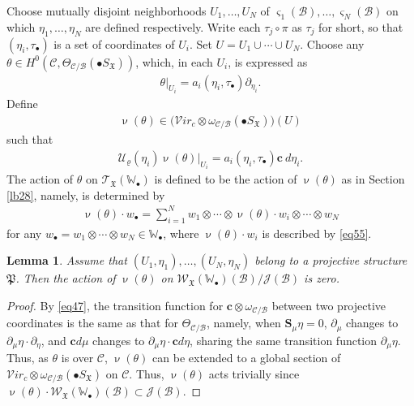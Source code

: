 \documentclass[11pt,b5paper,notitlepage]{article}
\theoremstyle{definition}
\theoremstyle{plain}
\newtheorem{lm}[df]{Lemma}
\newcommand{\fk}{\mathfrak}
\newcommand{\mc}{\mathcal}
\newcommand{\scr}{\mathscr}
\newcommand{\sgm}{\varsigma}
\newcommand{\SX}{S_{\fk X}}
\newcommand{\blt}{\bullet}
\newcommand{\Wbb}{\mathbb W}
\newcommand{\cbf}{\mathbf c}
\newcommand{\svir}{\mathcal V\!\mathit{ir}}
\newcommand{\Sbf}{\mathbf{S}}
\numberwithin{equation}{section}
\begin{document}
Choose mutually disjoint neighborhoods $U_1,\dots,U_N$ of $\sgm_1(\mc B),\dots,\sgm_N(\mc B)$ on which $\eta_1,\dots,\eta_N$ are defined respectively. Write each $\tau_j\circ\pi$ as $\tau_j$ for short, so that $(\eta_i,\tau_\blt)$ is a set of coordinates of $U_i$. Set $U=U_1\cup\cdots\cup U_N$. Choose any $\theta\in H^0(\mc C,\Theta_{\mc C/\mc B}(\blt\SX))$, which, in each $U_i$, is expressed as
\begin{align}
\theta|_{U_i}=a_i(\eta_i,\tau_\blt)\partial_{\eta_i}.\label{eq52}
\end{align}
Define 
\begin{align*}
\upnu(\theta)\in \big(\svir_c\otimes \omega_{\mc C/\mc B}(\blt S_{\fk X})\big)(U)
\end{align*}
such that
\begin{align}
\mc U_\varrho(\eta_i)\upnu(\theta)|_{U_i}=a_i(\eta_i,\tau_\blt)\cbf~d{\eta_i}.\label{eq54}
\end{align}
The action of $\theta$ on $\scr T_{\fk X}(\Wbb_\blt)$ is defined to be the action of $\upnu(\theta)$ as in Section \ref{lb28}, namely, is determined by
\begin{align}
\upnu(\theta)\cdot w_\blt=\sum_{i=1}^N w_1\otimes\cdots\otimes \upnu(\theta)\cdot w_i\otimes\cdots \otimes w_N
\end{align}
for any $w_\blt=w_1\otimes\cdots\otimes w_N\in\Wbb_\blt$, where $\upnu(\theta)\cdot w_i$ is described by \eqref{eq55}. 


\begin{lm}\label{lb29}
Assume that $(U_1,\eta_1),\dots,(U_N,\eta_N)$ belong to a projective structure $\fk P$.  Then the action of $\upnu(\theta)$ on $\scr W_{\fk X}(\Wbb_\blt)(\mc B)/\scr J(\mc B)$ is zero.
\end{lm}

\begin{proof}
By \eqref{eq47}, the transition function for $\cbf \otimes \omega_{\mc C/\mc B}$  between two projective coordinates is the same as that for $\Theta_{\mc C/\mc B}$, namely, when $\Sbf_\mu\eta=0$, $\partial_\mu$ changes to $\partial_\mu\eta\cdot \partial_\eta$, and $\cbf d\mu$ changes to $\partial_\mu\eta\cdot \cbf d\eta$, sharing the same transition function $\partial_\mu\eta$. Thus, as $\theta$ is over $\mc C$, $\upnu(\theta)$ can be extended to a global section of $\svir_c\otimes \omega_{\mc C/\mc B}(\blt S_{\fk X})$ on $\mc C$.  Thus, $\upnu(\theta)$ acts trivially since $\upnu(\theta)\cdot \scr W_{\fk X}(\Wbb_\blt)(\mc B)\subset\scr J(\mc B)$.
\end{proof}
\end{document}
